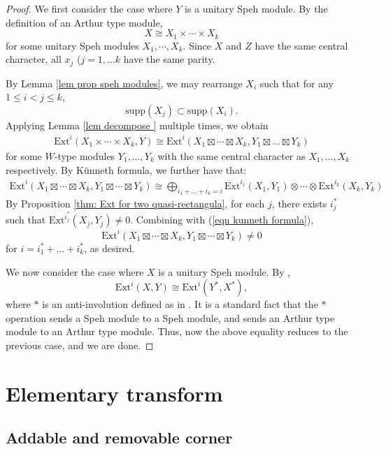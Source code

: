 \documentclass[11pt]{amsart}
\numberwithin{equation}{section}
\theoremstyle{definition}
\begin{document}
\begin{proof}
We first consider the case where $Y$ is a unitary Speh module. By the definition of an Arthur type module, 
\[   X \cong X_1\times \cdots \times X_k
\]
for some unitary Speh modules $X_1, \cdots, X_k$. Since \(X\) and \(Z\) have the same central character, all \(x_j\) (\(j=1,\ldots k\) have the same parity. 

By Lemma \ref{lem prop speh modules}, we may rearrange $X_i$ such that for any $1\leq i <j \leq k$,
\[   \mathrm{supp}(X_j)  \subset \mathrm{supp}(X_i).
\]
Applying Lemma \ref{lem decompose } multiple times, we obtain
\begin{align*}
      \mathrm{Ext}^i(X_1\times \cdots \times X_k, Y) \cong  \mathrm{Ext}^i(X_1\boxtimes \cdots \boxtimes X_k, Y_1\boxtimes \ldots \boxtimes Y_k)
\end{align*}
for some $W$-type modules $Y_1, \ldots, Y_k$ with the same central character as $X_1, \ldots, X_k$ respectively. By K\"unneth formula, we further have that:
\begin{align} \label{eqn kunneth formula}
\mathrm{Ext}^i(X_1\boxtimes \cdots \boxtimes X_k, Y_1\boxtimes \cdots \boxtimes Y_k) \cong \bigoplus_{i_1+\ldots +i_k=i} \mathrm{Ext}^{i_1}(X_1,Y_1)\otimes \cdots \otimes \mathrm{Ext}^{i_k}(X_k, Y_k) 
\end{align}
By Proposition \ref{thm: Ext for two quasi-rectangula}, for each $j$, there exists $i_j^*$ such that $\mathrm{Ext}^{i_j^*}(X_j, Y_j)\neq 0$. Combining with (\ref{eqn kunneth formula}),
\[ \mathrm{Ext}^i(X_1\boxtimes \cdots \boxtimes X_k, Y_1\boxtimes \cdots \boxtimes Y_k)\neq 0\]
for $i=i_1^*+\ldots+i_k^*$, as desired.


We now consider the case where $X$ is a unitary Speh module. By \cite[Proposition 4.10]{chan2016duality},
\[  \mathrm{Ext}^i(X, Y) \cong \mathrm{Ext}^i(Y^*, X^*) ,
\]
where $*$ is an anti-involution defined as in \cite[Section 4.2]{chan2016duality}. It is a standard fact that the $*$ operation sends a Speh module to a Speh module, and sends an Arthur type module to an Arthur type module. Thus, now the above equality reduces to the previous case, and we are done.
\end{proof}



\section{Elementary transform}\label{sec elementary transform}

\subsection{Addable and removable corner}
\end{document}
